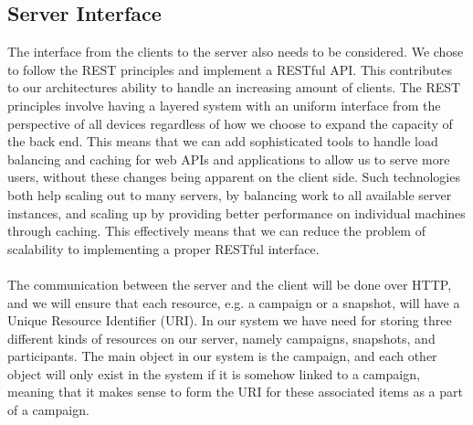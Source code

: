 \subsection{Server Interface}
\label{sub:server_interface}
The interface from the clients to the server also needs to be considered. We chose to follow the REST principles \parencite{http_manden} and implement a RESTful API. This contributes to our architectures ability to handle an increasing amount of clients. The REST principles involve having a layered system with an uniform interface from the perspective of all devices regardless of how we choose to expand the capacity of the back end. This means that we can add sophisticated tools to handle load balancing and caching for web APIs and applications to allow us to serve more users, without these changes being apparent on the client side. Such technologies both help scaling out to many servers, by balancing work to all available server instances, and scaling up by providing better performance on individual machines through caching. This effectively means that we can reduce the problem of scalability to implementing a proper RESTful interface. 
\\\\
The communication between the server and the client will be done over HTTP, and we will ensure that each resource, e.g. a campaign or a snapshot, will have a Unique Resource Identifier (URI). In our system we have need for storing three different kinds of resources on our server, namely campaigns, snapshots, and participants. The main object in our system is the campaign, and each other object will only exist in the system if it is somehow linked to a campaign, meaning that it makes sense to form the URI for these associated items as a part of a campaign. 
\\\\
